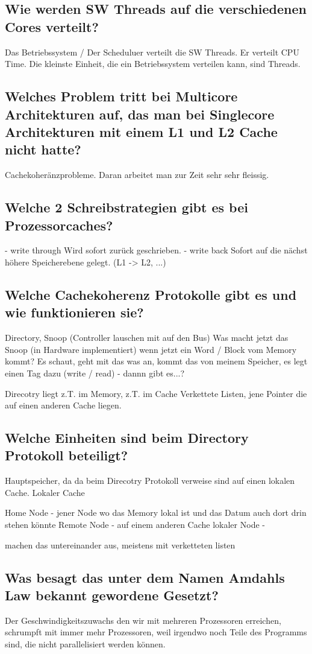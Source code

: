 \subsection{Wie werden SW Threads auf die verschiedenen Cores verteilt?}
Das Betriebssystem / Der Scheduluer verteilt die SW Threads. Er verteilt CPU Time. Die kleinste Einheit, die ein Betriebssystem verteilen kann, sind Threads.
\subsection{Welches Problem tritt bei Multicore Architekturen auf, das man bei Singlecore Architekturen mit einem L1 und L2 Cache nicht hatte?}
Cachekoheränzprobleme. Daran arbeitet man zur Zeit sehr sehr fleissig.
\subsection{Welche 2 Schreibstrategien gibt es bei Prozessorcaches?}
- write through
	Wird sofort zurück geschrieben.
- write back
	Sofort auf die nächst höhere Speicherebene gelegt. (L1 -> L2, ...)
\subsection{Welche Cachekoherenz Protokolle gibt es und wie funktionieren sie?}
Directory, Snoop (Controller lauschen mit auf den Bus)
Was macht jetzt das Snoop (in Hardware implementiert) wenn jetzt ein Word / Block vom Memory kommt?
Es schaut, geht mit das was an, kommt das von meinem Speicher, es legt einen Tag dazu (write / read) - dannn gibt es...?

Direcotry liegt z.T. im Memory, z.T. im Cache
Verkettete Listen, jene Pointer die auf einen anderen Cache liegen.
\subsection{Welche Einheiten sind beim Directory Protokoll beteiligt?}
Hauptspeicher, da da beim Direcotry Protokoll verweise sind auf einen lokalen Cache.
Lokaler Cache

Home Node - jener Node wo das Memory lokal ist und das Datum auch dort drin stehen könnte
Remote Node - auf einem anderen Cache
lokaler Node - 

machen das untereinander aus, meistens mit verketteten listen
\subsection{Was besagt das unter dem Namen Amdahls Law bekannt gewordene Gesetzt?}
Der Geschwindigkeitszuwachs den wir mit mehreren Prozessoren erreichen, schrumpft mit immer mehr Prozessoren, weil irgendwo noch Teile des Programms sind, die nicht parallelisiert werden können.
